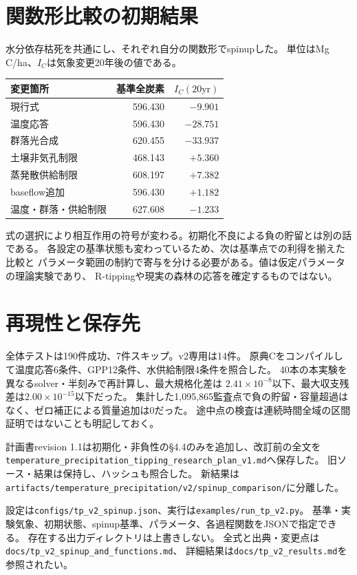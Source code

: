 \documentclass[a4paper,11pt]{ltjsarticle}
\newcommand{\code}[1]{\nolinkurl{#1}}
\begin{document}
\section{関数形比較の初期結果}
水分依存枯死を共通にし、それぞれ自分の関数形でspinupした。
単位はMg C/ha、$I_C$は気象変更20年後の値である。
\begin{center}
\begin{tabular}{lrr}
\toprule 変更箇所 & 基準全炭素 & $I_C(20\mathrm{yr})$\\\midrule
現行式 &596.430&$-9.901$\\
温度応答 &596.430&$-28.751$\\
群落光合成 &620.455&$-33.937$\\
土壌非気孔制限 &468.143&$+5.360$\\
蒸発散供給制限 &608.197&$+7.382$\\
baseflow追加 &596.430&$+1.182$\\
温度・群落・供給制限 &627.608&$-1.233$\\
\bottomrule
\end{tabular}
\end{center}
式の選択により相互作用の符号が変わる。初期化不良による負の貯留とは別の話である。
各設定の基準状態も変わっているため、次は基準点での利得を揃えた比較と
パラメータ範囲の制約で寄与を分ける必要がある。値は仮定パラメータの理論実験であり、
R-tippingや現実の森林の応答を確定するものではない。

\section{再現性と保存先}
全体テストは190件成功、7件スキップ。v2専用は14件。
原典Cをコンパイルして温度応答6条件、GPP12条件、水供給制限4条件を照合した。
40本の本実験を異なるsolver・半刻みで再計算し、最大規格化差は
$2.41\times10^{-8}$以下、最大収支残差は$2.00\times10^{-15}$以下だった。
集計した1,095,865監査点で負の貯留・容量超過はなく、ゼロ補正による質量追加は0だった。
途中点の検査は連続時間全域の区間証明ではないことも明記しておく。

計画書revision 1.1は初期化・非負性の§4.4のみを追加し、改訂前の全文を
\code{temperature_precipitation_tipping_research_plan_v1.md}へ保存した。
旧ソース・結果は保持し、ハッシュも照合した。
新結果は\code{artifacts/temperature_precipitation/v2/spinup_comparison/}に分離した。

設定は\code{configs/tp_v2_spinup.json}、実行は\code{examples/run_tp_v2.py}。
基準・実験気象、初期状態、spinup基準、パラメータ、各過程関数をJSONで指定できる。
存在する出力ディレクトリは上書きしない。
全式と出典・変更点は\code{docs/tp_v2_spinup_and_functions.md}、
詳細結果は\code{docs/tp_v2_results.md}を参照されたい。
\end{document}
